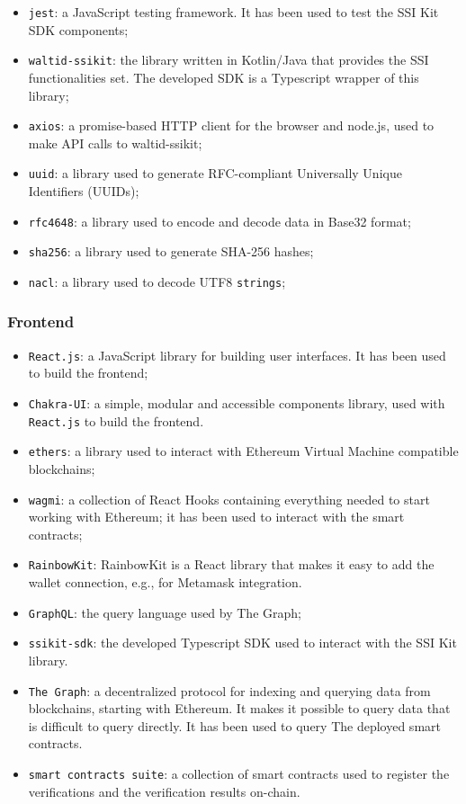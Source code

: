\begin{itemize}
    \setlength\itemsep{-0.1em}
    \item \texttt{jest}: a JavaScript testing framework. It has been used to test
    the SSI Kit SDK components;
    \item \texttt{waltid-ssikit}: the library written in Kotlin/Java that provides 
    the SSI functionalities set. The developed SDK is a Typescript wrapper of this 
    library;
    \item \texttt{axios}: a promise-based HTTP client for the browser and node.js,
    used to make API calls to waltid-ssikit;
    \item \texttt{uuid}: a library used to generate RFC-compliant Universally Unique
    Identifiers (UUIDs);
    \item \texttt{rfc4648}: a library used to encode and decode data in Base32 format;
    \item \texttt{sha256}: a library used to generate SHA-256 hashes;
    \item \texttt{nacl}: a library used to decode UTF8 \texttt{strings};
\end{itemize}

\subsubsection{Frontend}
\begin{itemize}
    \setlength\itemsep{-0.1em}
    \item \texttt{React.js}: a JavaScript library for building user interfaces. It
    has been used to build the frontend;
    \item \texttt{Chakra-UI}: a simple, modular and accessible components library,
    used with \texttt{React.js} to build the frontend.
    \item \texttt{ethers}: a library used to interact with Ethereum Virtual
    Machine compatible blockchains;
    \item \texttt{wagmi}: a collection of React Hooks containing everything needed
    to start working with Ethereum; it has been used to interact with the smart
    contracts;
    \item \texttt{RainbowKit}: RainbowKit is a React library that makes it easy to 
    add the wallet connection, e.g., for Metamask integration.
    \item \texttt{GraphQL}: the query language used by The Graph;
    \item \texttt{ssikit-sdk}: the developed Typescript SDK used to interact with 
    the SSI Kit library.
    \item \texttt{The Graph}: a decentralized protocol for indexing and querying
    data from blockchains, starting with Ethereum. It makes it possible to query 
    data that is difficult to query directly. It has been used to query The
    deployed smart contracts.
    \item \texttt{smart contracts suite}: a collection of smart contracts used to
    register the verifications and the verification results on-chain.
\end{itemize}

